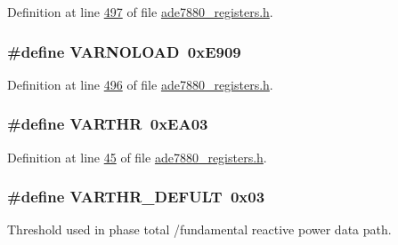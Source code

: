 Definition at line \hyperlink{a00036_source_l00497}{497} of file \hyperlink{a00036_source}{ade7880\-\_\-registers.\-h}.

\hypertarget{a00036_add44e087f0f18c22c64adefc3cd8e7c6}{
\subsubsection[{V\-A\-R\-N\-O\-L\-O\-A\-D}]{\setlength{\rightskip}{0pt plus 5cm}\#define V\-A\-R\-N\-O\-L\-O\-A\-D~0x\-E909}}\label{de/d8c/a00036_add44e087f0f18c22c64adefc3cd8e7c6}


Definition at line \hyperlink{a00036_source_l00496}{496} of file \hyperlink{a00036_source}{ade7880\-\_\-registers.\-h}.

\hypertarget{a00036_a37f9d81c6baec7ee49887b6f19ac1996}{
\subsubsection[{V\-A\-R\-T\-H\-R}]{\setlength{\rightskip}{0pt plus 5cm}\#define V\-A\-R\-T\-H\-R~0x\-E\-A03}}\label{de/d8c/a00036_a37f9d81c6baec7ee49887b6f19ac1996}


Definition at line \hyperlink{a00036_source_l00045}{45} of file \hyperlink{a00036_source}{ade7880\-\_\-registers.\-h}.

\hypertarget{a00036_a105c1723ae41d790579de1a93641abea}{
\subsubsection[{V\-A\-R\-T\-H\-R\-\_\-\-D\-E\-F\-U\-L\-T}]{\setlength{\rightskip}{0pt plus 5cm}\#define V\-A\-R\-T\-H\-R\-\_\-\-D\-E\-F\-U\-L\-T~0x03}}\label{de/d8c/a00036_a105c1723ae41d790579de1a93641abea}


Threshold used in phase total /fundamental reactive power data path. 



